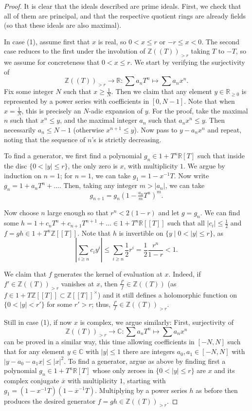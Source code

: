 \documentclass[11pt]{amsbook}
\numberwithin{equation}{section}
\numberwithin{theorem}{section}
\theoremstyle{definition}
\begin{document}
\begin{proof} It is clear that the ideals described are prime ideals. First, we check that all of them are principal, and that the respective quotient rings are already fields (so that these ideals are also maximal).

In case (1), assume first that $x$ is real, so $0<x\leq r$ or $-r\leq x<0$. The second case reduces to the first under the involution of $\mathbb Z((T))_{>r}$ taking $T$ to $-T$, so we assume for concreteness that $0<x\leq r$. We start by verifying the surjectivity of
\[
\mathbb Z((T))_{>r}\to \mathbb R: \sum a_n T^n\mapsto \sum a_n x^n.
\]
Fix some integer $N$ such that $x\geq \tfrac 1N$. Then we claim that any element $y\in \mathbb R_{\geq 0}$ is represented by a power series with coefficients in $[0,N-1]$. Note that when $x=\tfrac 1N$, this is precisely an $N$-adic expansion of $y$. For the proof, take the maximal $n$ such that $x^n\leq y$, and the maximal integer $a_n$ such that $a_n x^n\leq y$. Then necessarily $a_n\leq N-1$ (otherwise $x^{n+1}\leq y$). Now pass to $y-a_nx^n$ and repeat, noting that the sequence of $n$'s is strictly decreasing.

To find a generator, we first find a polynomial $g_n\in 1+T^n\mathbb R[T]$ such that inside the disc $\{0<|y|\leq r\}$, the only zero is $x$, with multiplicity $1$. We argue by induction on $n=1$; for $n=1$, we can take $g_1=1-x^{-1}T$. Now write $g_n=1+a_nT^n+\ldots$. Then, taking any integer $m>|a_n|$, we can take
\[
g_{n+1} = g_n(1-\tfrac{a_n}mT^n)^m.
\]

Now choose $n$ large enough so that $r^n<2(1-r)$ and let $g=g_n$. We can find some $h=1+c_nT^n+c_{n+1}T^{n+1}+\ldots\in 1+T^n\mathbb R[[T]]$ such that all $|c_i|\leq \tfrac 12$ and $f=gh\in 1+T^n\mathbb Z[[T]]$. Note that $h$ is invertible on $\{y\mid 0<|y|\leq r\}$, as
\[
|\sum_{i\geq n} c_iy^i|\leq \sum_{i\geq n} \frac 12 r^i = \frac 12 \frac{r^n}{1-r}<1.
\]

We claim that $f$ generates the kernel of evaluation at $x$. Indeed, if $f'\in \mathbb Z((T))_{>r}$ vanishes at $x$, then $\frac{f'}f\in \mathbb Z((T))$ (as $f\in 1+T\mathbb Z[[T]]\subset \mathbb Z[[T]]^\times$) and it still defines a holomorphic function on $\{0<|y|<r'\}$ for some $r'>r$; thus, $\frac{f'}f\in \mathbb Z((T))_{>r}$.

Still in case (1), if now $x$ is complex, we argue similarly: First, surjectivity of
\[
\mathbb Z((T))_{>r}\to \mathbb C: \sum a_n T^n\mapsto \sum a_n x^n
\]
can be proved in a similar way, this time allowing coefficients in $[-N,N]$ such that for any element $y\in \mathbb C$ with $|y|\leq 1$ there are integers $a_0,a_1\in[-N,N]$ with $|y-a_0-a_1x|\leq |x|^2$. To find a generator, argue as above by finding first a polynomial $g_n\in 1+T^n\mathbb R[T]$ whose only zeroes in $\{0<|y|\leq r\}$ are $x$ and its complex conjugate $\overline{x}$ with multiplicity $1$, starting with $g_1=(1-x^{-1}T)(1-\overline{x}^{-1}T)$. Multiplying by a power series $h$ as before then produces the desired generator $f=gh\in \mathbb Z((T))_{>r}$.


\end{proof}
\end{document}
